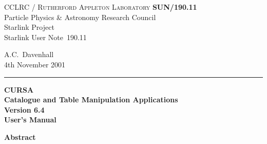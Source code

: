 \documentclass[twoside,11pt]{article}
\newcommand{\CURSAversion}{6.4~}
\newcommand{\stardoccategory}  {Starlink User Note}
\newcommand{\stardocinitials}  {SUN}
\newcommand{\stardocnumber}    {190.11}
\newcommand{\stardocauthors}   {A.C.~Davenhall}
\newcommand{\stardocdate}      {4th November 2001}
\newcommand{\stardoctitle}     {CURSA \\ [1ex]
                            Catalogue and Table Manipulation Applications}
\newcommand{\stardocversion}   {Version \CURSAversion}
\newcommand{\stardocmanual}    {User's Manual}
\newcommand{\stardocname}{\stardocinitials /\stardocnumber}
\newenvironment{latexonly}{}{}
\renewcommand{\_}{\texttt{\symbol{95}}}
\begin{document}
\thispagestyle{empty}

\begin{latexonly}
   CCLRC / \textsc{Rutherford Appleton Laboratory} \hfill \textbf{\stardocname}\\
   {\large Particle Physics \& Astronomy Research Council}\\
   {\large Starlink Project\\}
   {\large \stardoccategory\ \stardocnumber}
   \begin{flushright}
   \stardocauthors\\
   \stardocdate
   \end{flushright}
   \vspace{-4mm}
   \rule{\textwidth}{0.5mm}
   \vspace{5mm}
   \begin{center}
   {\Huge\textbf{\stardoctitle \\ [2.5ex]}}
   {\LARGE\textbf{\stardocversion \\ [4ex]}}
   {\Huge\textbf{\stardocmanual}}
   \end{center}
   \vspace{5mm}


   \vspace{10mm}
   \begin{center}
      {\Large\textbf{Abstract}}
   \end{center}
\end{latexonly}
\end{document}
